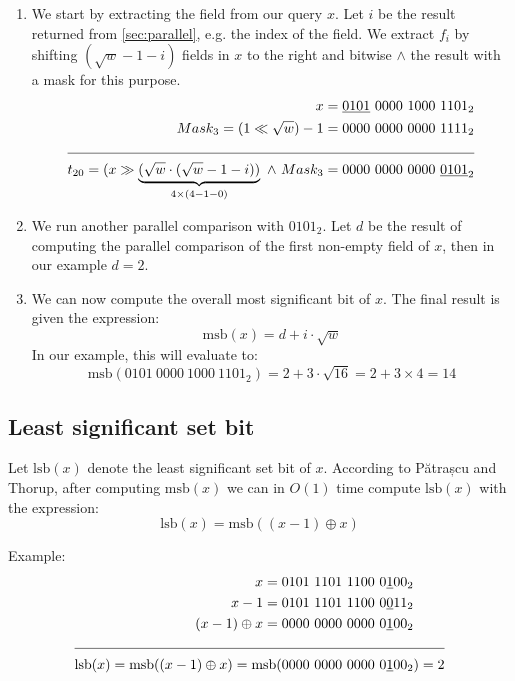 \begin{enumerate}
    \item
    We start by extracting the field from our query $x$. Let $i$ be the result returned from \ref{sec:parallel}, e.g. the index of the field. We extract $f_i$ by shifting $(\sqrt{w} - 1 - i)$ fields in $x$ to the right and bitwise $\wedge$ the result with a mask for this purpose.
    \begin{align*}
        x = \underline{0101}\ 0000\ 1000\ 1101_2 &\\
        Mask_3 = (1 \ll \sqrt{w}) - 1 = 0000\ 0000\ 0000\ 1111_2 &\\
        \cline{1-2}
        t_{20} = (x \gg \underbrace{(\sqrt{w} \cdot (\sqrt{w} - 1 - i))}_{4\times(4-1-0)}\ \wedge\ Mask_3 = 0000\ 0000\ 0000\ \underline{0101}_2 &
    \end{align*}
    \item
    We run another parallel comparison with $0101_2$. Let $d$ be the result of computing the parallel comparison of the first non-empty field of $x$, then in our example $d = 2$.
    \item
    We can now compute the overall most significant bit of $x$. The final result is given the expression:
    \begin{equation*}
        \text{msb}(x) = d + i\cdot\sqrt{w}
    \end{equation*}
    In our example, this will evaluate to:
    \begin{equation*}
        \text{msb}(0101\ 0000\ 1000\ 1101_2) = 2 + 3\cdot\sqrt{16} = 2 + 3 \times 4 = 14
    \end{equation*}
\end{enumerate}

\subsection{Least significant set bit} \label{sec:lsbAlgorithm}

Let $\text{lsb}(x)$ denote the least significant set bit of $x$. According to Pătrașcu and Thorup, after computing $\text{msb}(x)$ we can in $O(1)$ time compute $\text{lsb}(x)$ with the expression:
\begin{equation*}
    \text{lsb}(x) = \text{msb}((x - 1) \oplus x)
\end{equation*}

Example:
\begin{align*}
    x = 0101\ 1101\ 1100\ 0\underline{1}00_2& \\
    x - 1 = 0101\ 1101\ 1100\ 0\underline{0}11_2& \\
    (x - 1) \oplus x = 0000\ 0000\ 0000\ 0\underline{1}00_2& \\
    \cline{1-2}
    \text{lsb}(x) = \text{msb}((x - 1) \oplus x) = \text{msb}(0000\ 0000\ 0000\ 0\underline{1}00_2&) = 2
\end{align*}

